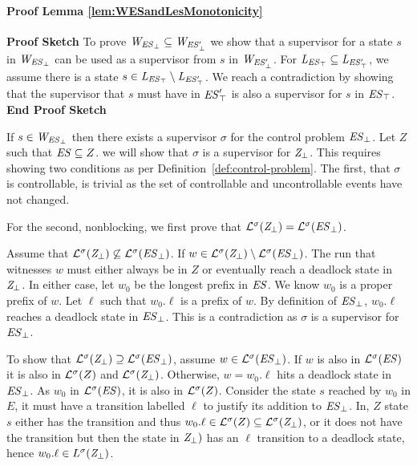 \paragraph*{Proof Lemma \ref{lem:WESandLesMonotonicity}}


\textbf{Proof Sketch}
To prove $\mathit{W_{\mathit{\mathit{ES}_{\bot}}}} \subseteq \mathit{W_{\mathit{\mathit{ES}'_{\bot}}}}$ we show that a supervisor for a 
state $s$ in $\mathit{W_{\mathit{\mathit{ES}_{\bot}}}}$ 
can be used as a supervisor from $s$ in $\mathit{W_{\mathit{\mathit{ES}'_{\bot}}}}$. For $\mathit{L_{\mathit{\mathit{ES}_{\top}}}} \subseteq 
\mathit{L_{\mathit{\mathit{ES}'_{\top}}}}$, we assume 
there is a state $s \in \mathit{L_{\mathit{\mathit{ES}_{\top}}}} \setminus \mathit{L_{\mathit{\mathit{ES}'_{\top}}}} $. We reach a 
contradiction by showing that the 
supervisor that $s$ must have in 
$\mathit{\mathit{ES}'_{\top}}$ is also a 
supervisor for $s$ in $\mathit{\mathit{ES}_{\top}}$.
\textbf{End Proof Sketch}


If $s \in \mathit{W_{\mathit{\mathit{ES}_{\bot}}}} $ then there exists a supervisor $\sigma$ for the control problem 
$\mathit{\mathit{ES}_{\bot}}$. Let $Z$ such that $\mathit{ES} \subseteq Z$. we will 
show that $\sigma$ is a supervisor for $\mathit{Z_{\bot}}$.  This requires showing two 
conditions as per Definition~\ref{def:control-problem}. The first, that $\sigma$ is 
controllable, is trivial as the set of controllable and uncontrollable events have not changed. 

For the second, nonblocking, we first prove that $\mathcal{L}^\sigma(\mathit{Z_{\bot}}) = 
\mathcal{L}^\sigma(\mathit{\mathit{ES}_{\bot}})$. 

Assume that $\mathcal{L}^\sigma(\mathit{Z_{\bot}}) \not\subseteq \mathcal{L}^\sigma(\mathit{\mathit{ES}_{\bot}})$.
If $w \in 
\mathcal{L}^\sigma(\mathit{Z_{\bot}}) \setminus \mathcal{L}^\sigma(\mathit{\mathit{ES}_{\bot}})$. 
The run that witnesses $w$ must either always be in $Z$ or eventually reach a deadlock state 
in $\mathit{Z_{\bot}}$. In either case, let $w_0$ be the longest prefix in $\mathit{ES}$. 
We know $w_0$ is a proper prefix of $w$. Let $\ell$ such that $w_0.\ell$ is a prefix of $w$. 
By definition of $\mathit{\mathit{ES}_{\bot}}$, $w_0.\ell$ reaches a deadlock state in  
$\mathit{\mathit{ES}_{\bot}}$. This is a contradiction as $\sigma$ is a supervisor for 
$\mathit{\mathit{ES}_{\bot}}$. 

To show that $\mathcal{L}^\sigma(\mathit{Z_{\bot}}) \supseteq \mathcal{L}^\sigma(\mathit{\mathit{ES}_{\bot}})$, assume $w \in \mathcal{L}^\sigma(\mathit{\mathit{ES}_{\bot}})$. If $w$ is also in $\mathcal{L}^\sigma(\mathit{ES})$ it is also in $\mathcal{L}^\sigma(Z)$ and $\mathcal{L}^\sigma(\mathit{Z_{\bot}})$. Otherwise, $w = w_0.\ell$ hits a 
deadlock state in $\mathit{\mathit{ES}_{\bot}}$. As $w_0$ in $\mathcal{L}^\sigma(\mathit{ES})$, 
it is also in $\mathcal{L}^\sigma(Z)$. Consider the state $s$ reached by $w_0$ in $E$, it must have a 
transition labelled $\ell$ to justify its addition to $\mathit{\mathit{ES}_{\bot}}$. In, $Z$ 
state $s$ either has the transition and thus  $w_0.\ell \in \mathcal{L}^\sigma(Z) \subseteq 
\mathcal{L}^\sigma(\mathit{Z_{\bot}})$, or it does not have the transition but then the state in 
$\mathit{Z_{\bot}})$ has an $\ell$ transition to a deadlock state, hence $w_0.\ell \in 
L^\sigma(\mathit{Z_{\bot}})$.

